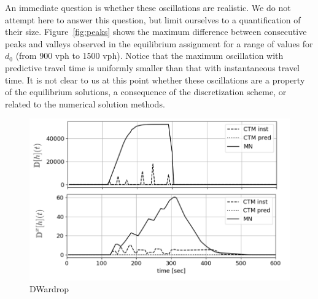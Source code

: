 An immediate question is whether these oscillations are realistic. We do not attempt here to answer this question, but limit ourselves to a quantification of their size. Figure~\ref{fig:peaks} shows the maximum difference between consecutive peaks and valleys observed in the equilibrium assignment for a range of values for $d_0$ (from 900 vph to 1500 vph). Notice that the maximum oscillation with predictive travel time is uniformly smaller than that with instantaneous travel time. It is not clear to us at this point whether these oscillations are a property of the equilibrium solutions, a consequence of the discretization scheme, or related to the numerical solution methods. 

\begin{figure}[h]
    \centering
    \includegraphics[width=\linewidth]{figs/DWardrop.png}
    \caption{DWardrop}
    \label{fig:dWardrop}
\end{figure}


